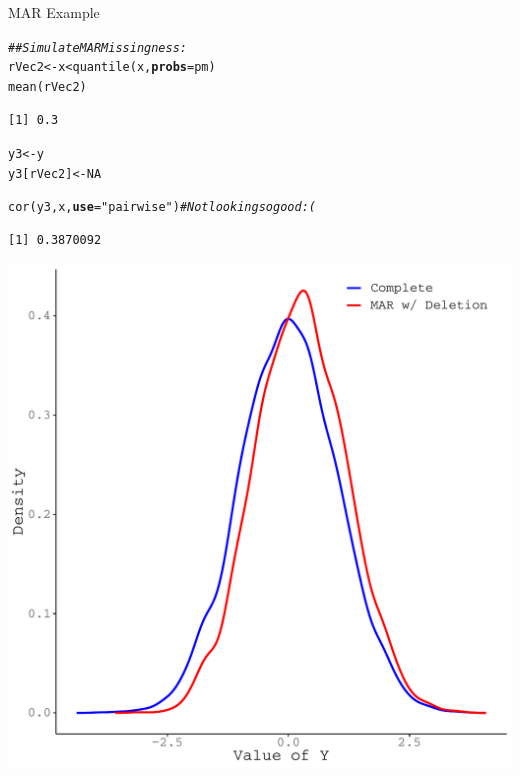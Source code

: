 \documentclass{beamer}\usepackage[]{graphicx}\usepackage[]{color}
\makeatletter
\newcommand{\hlnum}[1]{\textcolor[rgb]{0.69,0.494,0}{#1}}%
\newcommand{\hlstr}[1]{\textcolor[rgb]{0.749,0.012,0.012}{#1}}%
\newcommand{\hlcom}[1]{\textcolor[rgb]{0.514,0.506,0.514}{\textit{#1}}}%
\newcommand{\hlopt}[1]{\textcolor[rgb]{0,0,0}{#1}}%
\newcommand{\hlstd}[1]{\textcolor[rgb]{0,0,0}{#1}}%
\newcommand{\hlkwb}[1]{\textcolor[rgb]{0,0.341,0.682}{#1}}%
\newcommand{\hlkwc}[1]{\textcolor[rgb]{0,0,0}{\textbf{#1}}}%
\newcommand{\hlkwd}[1]{\textcolor[rgb]{0.004,0.004,0.506}{#1}}%
\newenvironment{kframe}{%
 \def\at@end@of@kframe{}%
 \ifinner\ifhmode%
  \def\at@end@of@kframe{\end{minipage}}%
  \begin{minipage}{\columnwidth}%
 \fi\fi%
 \def\FrameCommand##1{\hskip\@totalleftmargin \hskip-\fboxsep
 \colorbox{shadecolor}{##1}\hskip-\fboxsep
     \hskip-\linewidth \hskip-\@totalleftmargin \hskip\columnwidth}%
 \MakeFramed {\advance\hsize-\width
   \@totalleftmargin\z@ \linewidth\hsize
   \@setminipage}}%
 {\par\unskip\endMakeFramed%
 \at@end@of@kframe}
\newenvironment{knitrout}{}{} %
\makeatother
\begin{document}
\begin{frame}{MAR Example}
  
\begin{knitrout}\footnotesize
{}\color{fgcolor}\begin{kframe}
\begin{alltt}
\hlcom{## Simulate MAR Missingness:}
\hlstd{rVec2} \hlkwb{<-} \hlstd{x} \hlopt{<} \hlkwd{quantile}\hlstd{(x,} \hlkwc{probs} \hlstd{= pm)}
\hlkwd{mean}\hlstd{(rVec2)}
\end{alltt}
\begin{verbatim}
[1] 0.3
\end{verbatim}
\begin{alltt}
\hlstd{y3} \hlkwb{<-} \hlstd{y}
\hlstd{y3[rVec2]} \hlkwb{<-} \hlnum{NA}

\hlkwd{cor}\hlstd{(y3, x,} \hlkwc{use} \hlstd{=} \hlstr{"pairwise"}\hlstd{)} \hlcom{# Not looking so good :(}
\end{alltt}
\begin{verbatim}
[1] 0.3870092
\end{verbatim}
\end{kframe}
\end{knitrout}

\pagebreak

\begin{knitrout}\footnotesize
{}\color{fgcolor}

{\centering \includegraphics[width=0.65\linewidth]{figure/intro-unnamed-chunk-14-1} 

}


\end{knitrout}

\end{frame}
\end{document}
